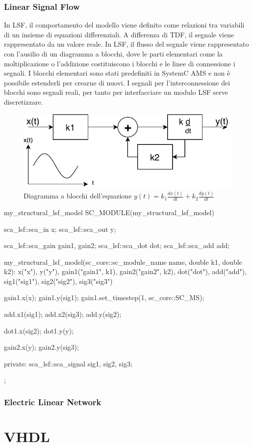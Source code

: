 \documentclass[10pt,a4paper,oneside]{scrbook}
\begin{document}
\subsection{Linear Signal Flow}
In LSF, il comportamento del modello viene definito come relazioni tra variabili di un insieme di equazioni differenziali.
A differenza di TDF, il segnale viene rappresentato da un valore reale.
In LSF, il flusso del segnale viene rappresentato con l'ausilio di un diagramma a blocchi, dove le parti elementari come 
la moltiplicazione o l'addizione costituiscono i blocchi e le linee di connessione i segnali.
I blocchi elementari sono stati predefiniti in SystemC AMS e non è possibile estenderli per crearne di nuovi. I segnali
per l'interconnessione dei blocchi sono segnali reali, per tanto per interfacciare un modulo LSF serve discretizzare.
\begin{figure}[h]
    \centering
    \includegraphics[width=1\linewidth]{"img/lsf"}
    \caption{Diagramma a blocchi dell'equazione $y(t)=k_1\frac{dx(t)}{dt}+k_2\frac{dy(t)}{dt}$}
    \label{fig:lsf}
\end{figure}

\begin{systemc}{my\_structural\_lsf\_model}
SC_MODULE(my_structural_lsf_model)
{
    sca_lsf::sca_in     x;
    sca_lsf::sca_out    y;
    
    sca_lsf::sca_gain   gain1, gain2;
    sca_lsf::sca_dot    dot;
    sca_lsf::sca_add    add;
    
    my_structural_lsf_model(sc_core::sc_module_name name,
                            double k1,
                            double k2):
        x("x"),
        y("y"),
        gain1("gain1", k1),
        gain2("gain2", k2),
        dot("dot"),
        add("add"),
        sig1("sig1"),
        sig2("sig2"),
        sig3("sig3")
    {
        gain1.x(x);
        gain1.y(sig1);
        gain1.set_timestep(1, sc_core::SC_MS);
        
        add.x1(sig1);
        add.x2(sig3);
        add.y(sig2);
        
        dot1.x(sig2);
        dot1.y(y);
        
        gain2.x(y);
        gain2.y(sig3);
    }
    
private:
    sca_lsf::sca_signal sig1, sig2, sig3;
};
\end{systemc}

\subsection{Electric Linear Network}




\chapter{VHDL}
\end{document}
